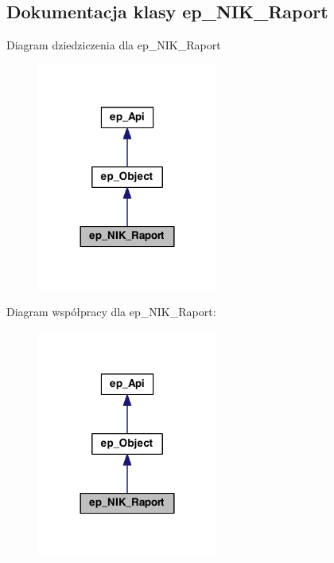 \hypertarget{classep___n_i_k___raport}{\subsection{Dokumentacja klasy ep\-\_\-\-N\-I\-K\-\_\-\-Raport}
\label{classep___n_i_k___raport}
}


Diagram dziedziczenia dla ep\-\_\-\-N\-I\-K\-\_\-\-Raport\nopagebreak
\begin{figure}[H]
\begin{center}
\leavevmode
\includegraphics[width=168pt]{classep___n_i_k___raport__inherit__graph}
\end{center}
\end{figure}


Diagram współpracy dla ep\-\_\-\-N\-I\-K\-\_\-\-Raport\-:\nopagebreak
\begin{figure}[H]
\begin{center}
\leavevmode
\includegraphics[width=168pt]{classep___n_i_k___raport__coll__graph}
\end{center}
\end{figure}
